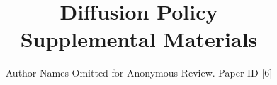 \documentclass[conference]{IEEEtran}
\begin{document}
\title{Diffusion Policy \\ \LARGE{Supplemental Materials}}
\author{Author Names Omitted for Anonymous Review. Paper-ID [6]}






\maketitle
\IEEEpeerreviewmaketitle







\end{document}
